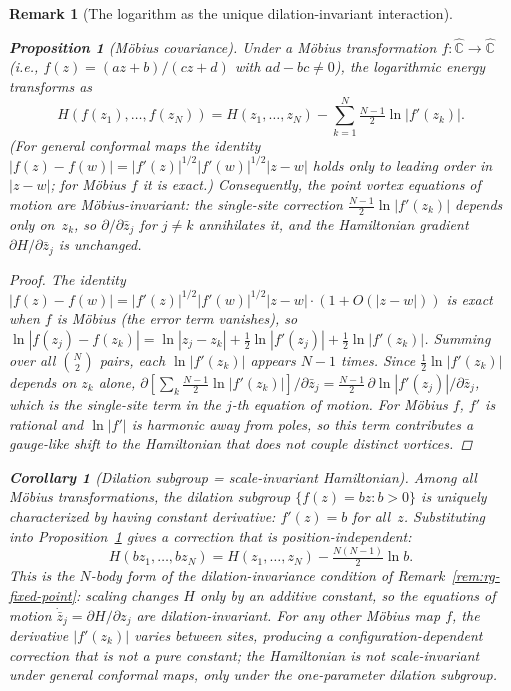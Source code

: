 \documentclass[12pt, a4paper]{article}
\newtheorem{proposition}[theorem]{Proposition}
\newtheorem{corollary}[theorem]{Corollary}
\newtheorem{remark}{Remark}[section]
\numberwithin{equation}{section}
\begin{document}
\begin{remark}[The logarithm as the unique dilation-invariant interaction]
\begin{proposition}[M\"obius covariance]\label{prop:mobius}
Under a M\"obius transformation $f\colon\hat{\mathbb{C}}\to
\hat{\mathbb{C}}$ (i.e., $f(z) = (az+b)/(cz+d)$ with
$ad - bc \ne 0$), the logarithmic energy transforms as
\[
  H(f(z_1),\dots,f(z_N))
  = H(z_1,\dots,z_N) - \sum_{k=1}^{N}\tfrac{N-1}{2}\ln|f'(z_k)|.
\]
(For general conformal maps the identity $|f(z){-}f(w)|
= |f'(z)|^{1/2}|f'(w)|^{1/2}|z{-}w|$ holds only to leading order
in $|z{-}w|$; for M\"obius $f$ it is exact.)
Consequently, the point vortex equations of motion are
M\"obius-invariant: the single-site correction
$\tfrac{N-1}{2}\ln|f'(z_k)|$ depends only on~$z_k$, so
$\partial/\partial \bar z_j$ for $j \ne k$ annihilates it, and the
Hamiltonian gradient $\partial H/\partial \bar z_j$ is unchanged.
\end{proposition}
\begin{proof}
The identity $|f(z){-}f(w)| = |f'(z)|^{1/2}|f'(w)|^{1/2}|z{-}w|
\cdot(1 + O(|z{-}w|))$ is exact when $f$ is M\"obius (the error
term vanishes), so $\ln|f(z_j){-}f(z_k)| = \ln|z_j{-}z_k|
+ \tfrac12\ln|f'(z_j)| + \tfrac12\ln|f'(z_k)|$.  Summing over
all $\binom{N}{2}$ pairs, each $\ln|f'(z_k)|$ appears $N{-}1$
times.  Since $\tfrac12\ln|f'(z_k)|$ depends on $z_k$ alone,
$\partial[\sum_k\tfrac{N-1}{2}\ln|f'(z_k)|]/\partial\bar z_j
= \tfrac{N-1}{2}\,\partial\ln|f'(z_j)|/\partial\bar z_j$,
which is the single-site term in the $j$-th equation of motion.
For M\"obius $f$, $f'$ is rational and $\ln|f'|$ is harmonic away
from poles, so this term contributes a gauge-like shift to the
Hamiltonian that does not couple distinct vortices.
\end{proof}

\begin{corollary}[Dilation subgroup = scale-invariant Hamiltonian]
\label{cor:dilation-rg}
Among all M\"obius transformations, the dilation subgroup
$\{f(z) = bz : b > 0\}$ is uniquely characterized by having
constant derivative: $f'(z) = b$ for all~$z$.  Substituting
into Proposition~\ref{prop:mobius} gives a correction that is
\emph{position-independent}:
\begin{equation}\label{eq:dilation-rg}
  H(bz_1,\dots,bz_N)
  = H(z_1,\dots,z_N) - \tfrac{N(N-1)}{2}\ln b.
\end{equation}
This is the $N$-body form of the dilation-invariance condition of
Remark~\ref{rem:rg-fixed-point}: scaling changes $H$ only by an
additive constant, so the equations of motion
$\dot{\bar z}_j = \partial H/\partial z_j$ are dilation-invariant.
For any other M\"obius map $f$, the derivative $|f'(z_k)|$ varies
between sites, producing a configuration-dependent correction that
is not a pure constant; the Hamiltonian is \emph{not}
scale-invariant under general conformal maps, only under the
one-parameter dilation subgroup.


\end{corollary}
\end{remark}
\end{document}
